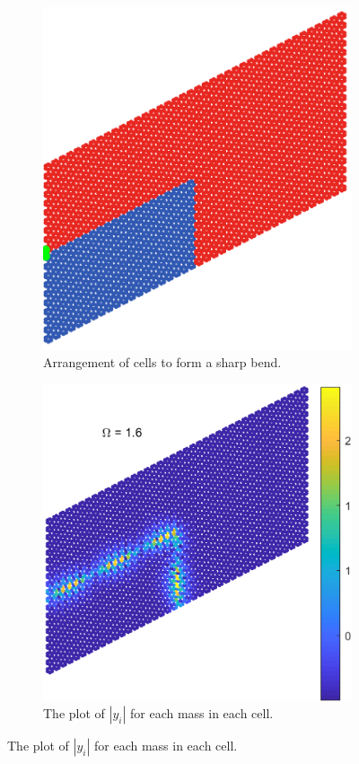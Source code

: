 \begin{figure}[!h]
\centering
\begin{subfigure}[b]{.5\textwidth}
  \centering
  \includegraphics[width=0.8\linewidth]{imgs/sharpbendarr.png}
  \caption{Arrangement of cells to form a sharp bend.}
  \label{fig:sub1}
\end{subfigure}%
\begin{subfigure}[b]{.5\textwidth}
  \centering
  \includegraphics[width=1\linewidth]{imgs/sharpbendscat.png}
  \caption{The plot of $|y_i|$ for each mass in each cell.}
  \label{fig:sub2}
\end{subfigure}


\end{figure}
